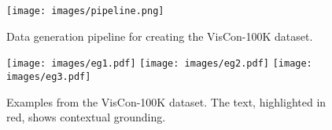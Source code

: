 \begin{figure*}[t]
  \centering
  \texttt{[image: images/pipeline.png]}
  \caption{Data generation pipeline for creating the VisCon-100K dataset.}
  \label{fig:pipeline}
\end{figure*}


\begin{figure*}[]
  \centering
  \texttt{[image: images/eg1.pdf]}
  \texttt{[image: images/eg2.pdf]}
  \texttt{[image: images/eg3.pdf]}
  \caption{Examples from the VisCon-100K dataset. The text, highlighted in red, shows contextual grounding.}
  \label{fig:examples}
\end{figure*}